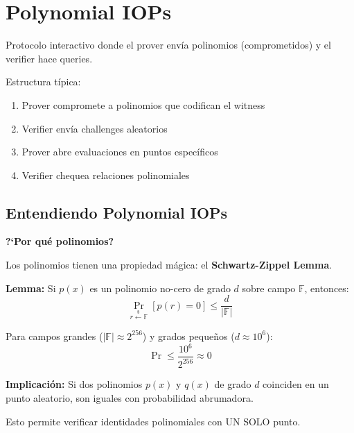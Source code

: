 \documentclass[11pt,a4paper,twoside]{book}
\newcommand{\F}{\mathbb{F}}
\begin{document}
\section{Polynomial IOPs}

\begin{definition}
Protocolo interactivo donde el prover env\'ia polinomios (comprometidos) y el verifier hace queries.
\end{definition}

Estructura t\'ipica:
\begin{enumerate}
    \item Prover compromete a polinomios que codifican el witness
    \item Verifier env\'ia challenges aleatorios
    \item Prover abre evaluaciones en puntos espec\'ificos
    \item Verifier chequea relaciones polinomiales
\end{enumerate}

\subsection{Entendiendo Polynomial IOPs}

\begin{intuicion}
\textbf{?`Por qu\'e polinomios?}

Los polinomios tienen una propiedad m\'agica: el \textbf{Schwartz-Zippel Lemma}.

\textbf{Lemma:} Si $p(x)$ es un polinomio no-cero de grado $d$ sobre campo $\F$, entonces:
\[ \Pr_{r \xleftarrow{\$} \F}[p(r) = 0] \leq \frac{d}{|\F|} \]

Para campos grandes ($|\F| \approx 2^{256}$) y grados peque\~nos ($d \approx 10^6$):
\[ \Pr \leq \frac{10^6}{2^{256}} \approx 0 \]

\textbf{Implicaci\'on:} Si dos polinomios $p(x)$ y $q(x)$ de grado $d$ coinciden en un punto aleatorio, son iguales con probabilidad abrumadora.

Esto permite verificar identidades polinomiales con UN SOLO punto.
\end{intuicion}
\end{document}
